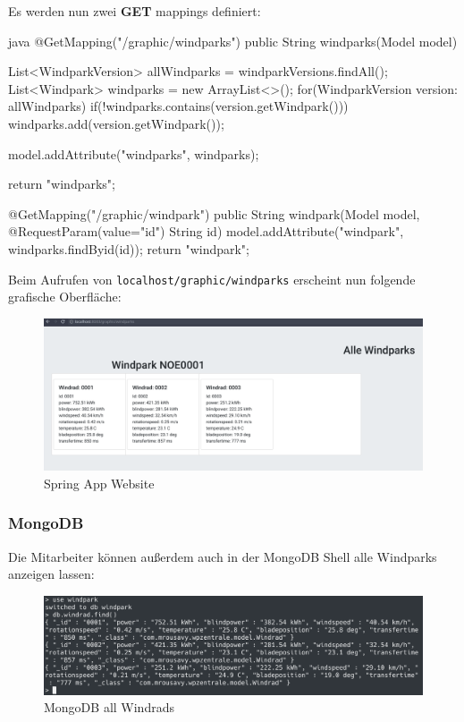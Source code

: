 Es werden nun zwei \textbf{GET} mappings definiert:

\begin{code}{java}
    @GetMapping("/graphic/windparks")
    public String windparks(Model model){
        List<WindparkVersion> allWindparks = windparkVersions.findAll();
        List<Windpark> windparks = new ArrayList<>();
        for(WindparkVersion version: allWindparks){
            if(!windparks.contains(version.getWindpark())){
                windparks.add(version.getWindpark());
            }
        }

        model.addAttribute("windparks", windparks);

        return "windparks";
    }

    @GetMapping("/graphic/windpark")
    public String windpark(Model model, @RequestParam(value="id") String id){
        model.addAttribute("windpark", windparks.findByid(id));
        return "windpark";
    }
\end{code}

Beim Aufrufen von \texttt{localhost/graphic/windparks} erscheint nun folgende grafische Oberfläche:

\begin{figure}
    \caption{Spring App Website}
    \includegraphics[width=15cm]{images/spring-app-gui}
    \centering
\end{figure}





\clearpage
\subsubsection{MongoDB}

Die Mitarbeiter können außerdem auch in der MongoDB Shell alle Windparks anzeigen lassen:

\begin{figure}
    \caption{MongoDB all Windrads}
    \includegraphics[width=15cm]{images/mongo-windrads}
    \centering
\end{figure}




